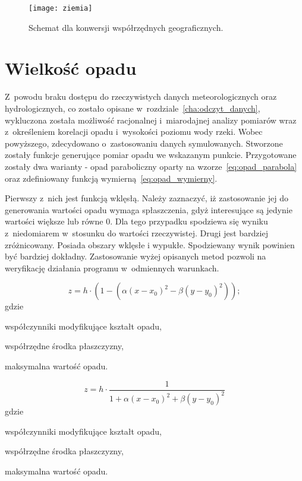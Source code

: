 \begin{figure}[!ht]
	\centering
	\texttt{[image: ziemia]}
	\caption{Schemat dla konwersji współrzędnych geograficznych.}
	\label{fig:ziemia}
\end{figure}

\section{Wielkość opadu}
\label{sec:funkcje_opadu}
Z~powodu braku dostępu do rzeczywistych danych meteorologicznych oraz hydrologicznych, co zostało opisane w~rozdziale~\ref{cha:odczyt_danych}, wykluczona została możliwość racjonalnej i~miarodajnej analizy pomiarów wraz z~określeniem korelacji opadu i~wysokości poziomu wody rzeki. Wobec powyższego, zdecydowano o~zastosowaniu danych symulowanych. Stworzone zostały funkcje generujące pomiar opadu we wskazanym punkcie. Przygotowane zostały dwa warianty - opad paraboliczny oparty na wzorze~\ref{eq:opad_parabola} oraz zdefiniowany funkcją wymierną~\ref{eq:opad_wymierny}.


Pierwszy z~nich jest funkcją wklęsłą. Należy zaznaczyć, iż zastosowanie jej do generowania wartości opadu wymaga spłaszczenia, gdyż interesujące są jedynie wartości większe lub równe 0. Dla tego przypadku spodziewa się wyniku z~niedomiarem w~stosunku do wartości rzeczywistej. Drugi jest bardziej zróżnicowany. Posiada obszary wklęsłe i wypukłe. Spodziewany wynik powinien być bardziej dokładny. Zastosowanie wyżej opisanych metod pozwoli na weryfikację działania programu w~odmiennych warunkach.

\begin{equation}
z = h \cdot (1 - (\alpha (x - x_0)^2 - \beta (y - y_0)^2) );
\label{eq:opad_parabola}
\end{equation}
gdzie
\begin{description}[leftmargin=3cm, itemsep=0cm, labelsep=0cm]
	\item[$\alpha, \beta$] współczynniki modyfikujące kształt opadu,
	\item[$x_0, y_0$] współrzędne środka płaszczyzny,
	\item[$h$] maksymalna wartość opadu.
\end{description}

\begin{equation}
z = h \cdot \frac{1}{1 + \alpha (x-x_0)^2 + \beta (y-y_0)^2}
\label{eq:opad_wymierny}
\end{equation}
gdzie
\begin{description}[leftmargin=3cm, itemsep=0cm, labelsep=0cm]
	\item[$\alpha, \beta$] współczynniki modyfikujące kształt opadu,
	\item[$x_0, y_0$] współrzędne środka płaszczyzny,
	\item[$h$] maksymalna wartość opadu.
\end{description}

